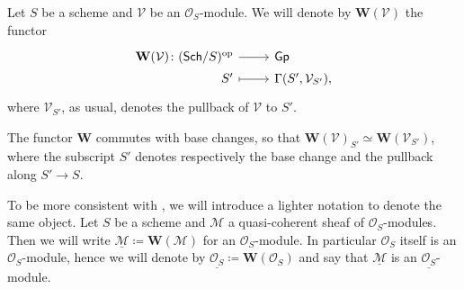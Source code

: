 \begin{defn}\label{defn:fppfSheafAssociatedtoMod}
	Let $S$ be a scheme and $\mathcal{V}$ be an $\mathcal{O}_{ S }$-module.
	We will denote by $\mathbf{W}(\mathcal{V})$ the functor
	\begin{equation*}
	\begin{tikzcd}[row sep = 0ex
		,/tikz/column 1/.append style={anchor=base east}
		,/tikz/column 2/.append style={anchor=base west}]
		\mathbf{W}(\mathcal{V})\colon 
		(\mathsf{Sch}/S)^{\mathrm{op}} \arrow[r, "", rightarrow] &
		\mathsf{Gp} \\
		S' \arrow[r, "", mapsto] & 
		\Gamma(S', \mathcal{V}_{S'})
	,\end{tikzcd}
	\end{equation*} 
	where $\mathcal{V}_{S'}$, as usual, denotes the pullback of
	$\mathcal{V}$ to $S'$.
\end{defn}


\begin{prop}
	The functor $\mathbf{W}$ commutes with base changes,
	so that $\mathbf{W}(\mathcal{V})_{S'} \simeq \mathbf{W}(\mathcal{V}_{S'})$,
	where the subscript $S'$ denotes respectively the base change 
	and the pullback along $S' \to S$.
\end{prop}


\begin{ntt}\label{not:fppfOsModule}
	To be more consistent with \cite{Messing}, we will introduce a 
	lighter notation to denote the same object.
	Let $S$ be a scheme and $\mathcal{M}$ a quasi-coherent sheaf of $\mathcal{O}_{ S }$-modules.
	Then we will write $\underline{\mathcal{M}} \coloneqq \mathbf{W}(\mathcal{M})$ for
	an $\mathcal{O}_{ S }$-module.
	In particular $\mathcal{O}_{ S }$ itself is an $\mathcal{O}_{ S }$-module, hence
	we will denote by $\underline{\mathcal{O}_{ S }} \coloneqq \mathbf{W}(\mathcal{O}_{ S })$
	and say that $\underline{\mathcal{M}}$ is an $\underline{\mathcal{O}_{ S }}$-module.
\end{ntt}


